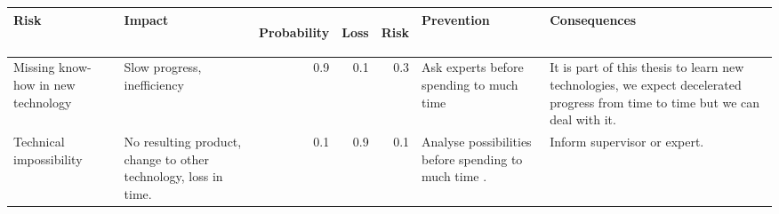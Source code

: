 \begin{tabular}[t]{|p{3cm}|p{3cm}|r|r|r|p{3cm}|p{3cm}|}\hline
\textbf{Risk} &
    \textbf{Impact} &
  \begin{sideways} \textbf{Probability } \end{sideways} &
  \begin{sideways}\textbf{Loss} \end{sideways} &
  \begin{sideways}\textbf{Risk} \end{sideways} &
  \textbf{Prevention} & \textbf{Consequences} \\ \hline
    Missing know-how in new technology & 
    Slow progress, inefficiency & 
    0.9 & 
    0.1 & 
    0.3 & 
    Ask experts before spending to much time & 
    It is part of this thesis to learn new technologies, we expect decelerated
    progress from time to time but we can deal with it. \\ \hline
  Technical impossibility & 
    No resulting product, change to other technology, loss in time. & 
    0.1 & 
    0.9 & 
    0.1 & 
    Analyse possibilities before spending to much time . &
    Inform supervisor or expert.
    \\ \hline
\end{tabular}
\label{tab:Risiken}





